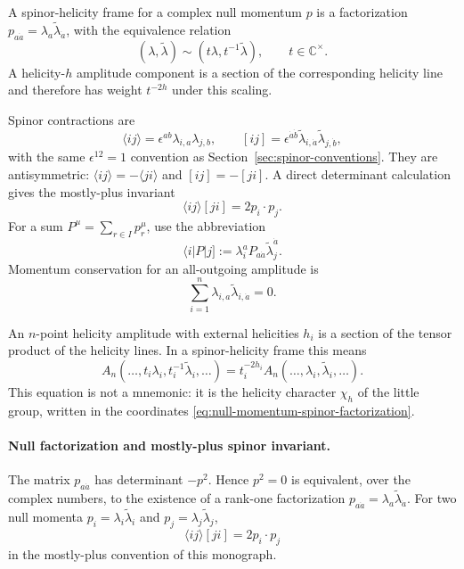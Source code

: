 \begin{definition}
\label{def:spinor-helicity-frame}
  A spinor-helicity frame for a complex null momentum \(p\) is a factorization
  \(p_{a\dot a}=\lambda_a\widetilde\lambda_{\dot a}\), with the equivalence
  relation
  \[
    (\lambda,\widetilde\lambda)
    \sim
    (t\lambda,t^{-1}\widetilde\lambda),\qquad t\in\mathbb C^\times .
  \]
  A helicity-\(h\) amplitude component is a section of the corresponding
  helicity line and therefore has weight \(t^{-2h}\) under this scaling.
\end{definition}

Spinor contractions are
\begin{equation}
  \langle ij\rangle
  =
  \epsilon^{ab}\lambda_{i,a}\lambda_{j,b},
  \qquad
  [ij]
  =
  \epsilon^{\dot a\dot b}
  \widetilde\lambda_{i,\dot a}
  \widetilde\lambda_{j,\dot b},
  \label{eq:spinor-helicity-brackets}
\end{equation}
with the same \(\epsilon^{12}=1\) convention as
Section~\ref{sec:spinor-conventions}.  They are antisymmetric:
\(\langle ij\rangle=-\langle ji\rangle\) and \([ij]=-[ji]\).  A direct
determinant calculation gives the mostly-plus invariant
\begin{equation}
  \langle ij\rangle[ji]
  =
  2p_i\cdot p_j.
  \label{eq:spinor-helicity-dot-product}
\end{equation}
For a sum \(P^\mu=\sum_{r\in I}p_r^\mu\), use the abbreviation
\[
  \langle i|P|j]
  :=
  \lambda_i^a P_{a\dot a}\widetilde\lambda_j^{\dot a}.
\]
Momentum conservation for an all-outgoing amplitude is
\begin{equation}
  \sum_{i=1}^n
  \lambda_{i,a}\widetilde\lambda_{i,\dot a}=0 .
  \label{eq:spinor-helicity-momentum-conservation}
\end{equation}

An \(n\)-point helicity amplitude with external helicities \(h_i\) is a
section of the tensor product of the helicity lines.  In a spinor-helicity
frame this means
\begin{equation}
  A_n(\ldots,t_i\lambda_i,t_i^{-1}\widetilde\lambda_i,\ldots)
  =
  t_i^{-2h_i}
  A_n(\ldots,\lambda_i,\widetilde\lambda_i,\ldots).
  \label{eq:spinor-helicity-amplitude-weight}
\end{equation}
This equation is not a mnemonic: it is the helicity character
\(\chi_h\) of the little group, written in the coordinates
\eqref{eq:null-momentum-spinor-factorization}.

\paragraph{Null factorization and mostly-plus spinor invariant.}
  The matrix \(p_{a\dot a}\) has determinant \(-p^2\).  Hence
  \(p^2=0\) is equivalent, over the complex numbers, to the existence of a
  rank-one factorization
  \(p_{a\dot a}=\lambda_a\widetilde\lambda_{\dot a}\).  For two null momenta
  \(p_i=\lambda_i\widetilde\lambda_i\) and
  \(p_j=\lambda_j\widetilde\lambda_j\),
  \[
    \langle ij\rangle[ji]=2p_i\cdot p_j
  \]
  in the mostly-plus convention of this monograph.

